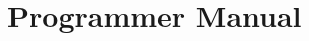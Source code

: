 \documentclass{dabcclass}
\begin{document}
\part{Programmer Manual}
 \cleardoublepage


\end{document}
